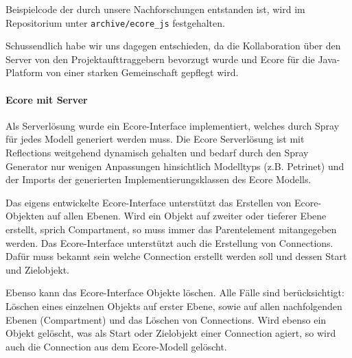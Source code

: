 Beispielcode der durch unsere Nachforschungen entstanden ist, wird im Repositorium
unter {\tt archive/ecore\_js} festgehalten.

Schussendlich habe wir uns dagegen entschieden, da die Kollaboration
über den Server von den Projektaufttraggebern bevorzugt wurde und
Ecore für die Java-Platform von einer starken Gemeinschaft gepflegt wird.

\paragraph{Ecore mit Server}
Als Serverlösung wurde ein Ecore-Interface implementiert, welches durch Spray
für jedes Modell generiert werden muss. Die Ecore Serverlösung ist mit Reflections weitgehend
dynamisch gehalten und bedarf durch den Spray Generator nur wenigen Anpassungen hinsichtlich
Modelltyps (z.B. Petrinet) und der Imports der generierten Implementierungsklassen des Ecore Modells.

Das eigens entwickelte Ecore-Interface unterstützt das Erstellen von Ecore-Objekten auf allen Ebenen.
Wird ein Objekt auf zweiter oder tieferer Ebene erstellt, sprich Compartment, so muss immer das Parentelement
mitangegeben werden. Das Ecore-Interface unterstützt auch die Erstellung von Connections. Dafür muss
bekannt sein welche Connection erstellt werden soll und dessen Start und Zielobjekt.

Ebenso kann das Ecore-Interface Objekte löschen. Alle Fälle sind berücksichtigt: Löschen eines einzelnen Objekts
auf erster Ebene, sowie auf allen nachfolgenden Ebenen (Compartment) und das Löschen von Connections. Wird ebenso 
ein Objekt gelöscht, was als Start oder Zielobjekt einer Connection agiert, so wird auch die Connection aus dem
Ecore-Modell gelöscht.